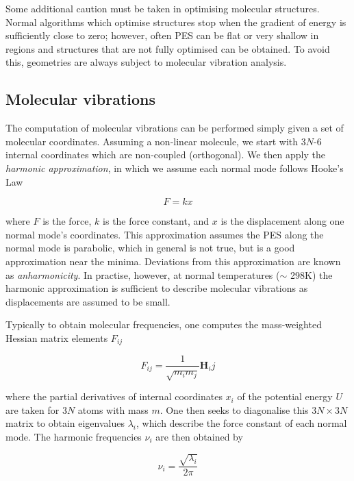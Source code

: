 Some additional caution must be taken in optimising molecular structures. Normal algorithms which optimise structures stop when the gradient of energy is sufficiently close to zero; however, often PES can be flat or very shallow in regions and structures that are not fully optimised can be obtained. To avoid this, geometries are always subject to molecular vibration analysis.

\subsection{Molecular vibrations}

The computation of molecular vibrations can be performed simply given a set of molecular coordinates.\cite{Wilson1980} Assuming a non-linear molecule, we start with 3$N$-6 internal coordinates which are non-coupled (orthogonal). We then apply the \emph{harmonic approximation}, in which we assume each normal mode follows Hooke's Law

\begin{equation}
  F = kx
\end{equation}


\noindent where $F$ is the force, $k$ is the force constant, and $x$ is the displacement along one normal mode's coordinates. This approximation assumes the PES along the normal mode is parabolic, which in general is not true, but is a good approximation near the minima. Deviations from this approximation are known as \emph{anharmonicity}. In practise, however, at normal temperatures ($\sim$ 298K) the harmonic approximation is sufficient to describe molecular vibrations as displacements are assumed to be small.

Typically to obtain molecular frequencies, one computes the mass-weighted Hessian matrix elements $F_{ij}$

\begin{equation}
  F_{ij} = \frac{1}{\sqrt{m_im_j}} \mathbf{H}_ij
\end{equation}

\noindent where the partial derivatives of internal coordinates $x_i$ of the potential energy $U$ are taken for 3$N$ atoms with mass $m$. One then seeks to diagonalise this $3N\times3N$ matrix to obtain eigenvalues $\lambda_i$, which describe the force constant of each normal mode. The harmonic frequencies $\nu_i$ are then obtained by

\begin{equation}
  \nu_i = \frac{\sqrt{\lambda_i}}{2\pi}
\end{equation}

